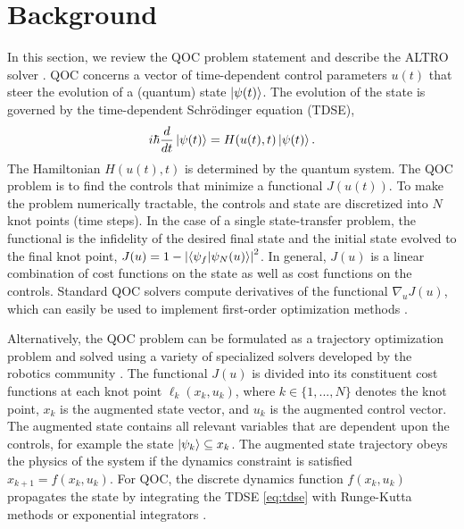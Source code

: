 \section{Background \label{sec:background}}
In this section, we
review the QOC problem statement
and describe the ALTRO solver \cite{howell2019altro}.
QOC concerns a vector of time-dependent control parameters $u(t)$
that steer the evolution of a (quantum) state $\ket{\psi(t)}$.
The evolution of the state is governed by the time-dependent
Schr{\"o}dinger equation (TDSE),
\begin{equation}
  i \hbar \frac{d}{dt} \ket{\psi(t)} = H(u(t), t) \ket{\psi(t)}.
  \label{eq:tdse}
\end{equation}
The Hamiltonian $H(u(t), t)$ is determined by the quantum system.
The QOC problem is to find the
controls that minimize a functional $J(u(t))$.
To make the problem numerically tractable,
the controls and state are discretized into $N$ knot points (time steps).
In the case of a single state-transfer problem, the functional is
the infidelity of the desired final state and the initial state evolved
to the final knot point,
$J(u) = 1 - {\lvert \braket{\psi_{f}}{\psi_{N}(u)} \rvert}^{2}$.
In general, $J(u)$ is a linear combination of cost functions on the state
as well as cost functions on the controls.
Standard QOC solvers compute derivatives of the functional $\nabla_{u} J(u)$,
which can easily be used to implement first-order optimization methods
\cite{machnes2015tunable, khaneja2005optimal, leung2017speedup, goerz2019krotov}.

Alternatively, the QOC problem can be formulated as a trajectory optimization problem 
and solved using a variety of specialized solvers developed by the robotics community
\cite{Schulman13, Tedrake16, Hereid2017FROST, howell2019altro}.
The functional $J(u)$ is divided into its constituent
cost functions at each knot point $\ell_{k}(x_{k}, u_{k})$,
where $k \in \{1, ..., N\}$ denotes the knot point,
$x_{k}$ is the augmented state vector,
and $u_{k}$ is the augmented control vector.
The augmented state contains all relevant variables
that are dependent upon the controls, for example the state
$\ket{\psi_{k}} \subseteq x_{k}$.
The augmented state trajectory obeys the physics of the system if
the dynamics constraint is satisfied
$x_{k + 1} = f(x_{k}, u_{k})$. For QOC, the discrete
dynamics function $f(x_{k}, u_{k})$ propagates the state by
integrating the TDSE \ref{eq:tdse} with Runge-Kutta methods \cite{jorgensen2011numerical}
or exponential integrators \cite{auer2018magnus, berland2005solving, einkemmer2017performance,
shillito2020fast}.

